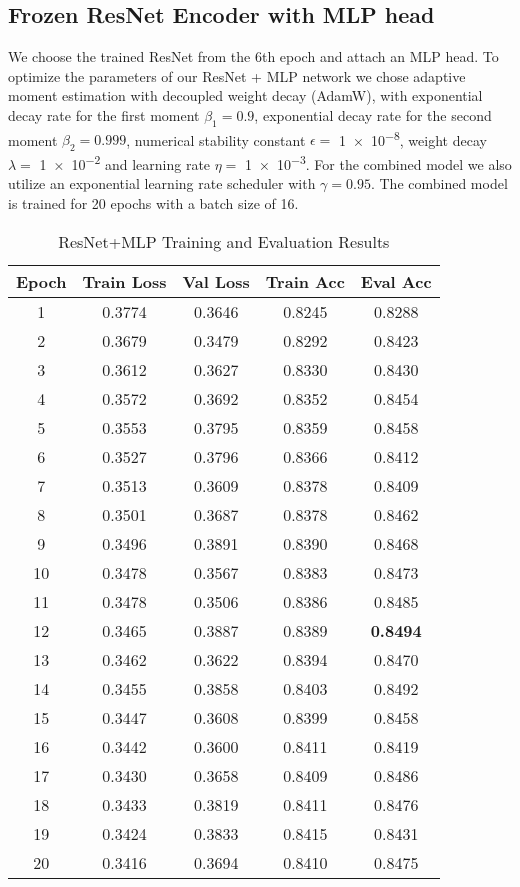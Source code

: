 \documentclass{article}
\begin{document}

\subsection{Frozen ResNet Encoder with MLP head}
We choose the trained ResNet from the 6th epoch and attach an MLP head. 
To optimize the parameters of our ResNet + MLP network we chose adaptive moment estimation with decoupled weight decay (AdamW),
with exponential decay rate for the first moment $\beta_1=0.9$, exponential decay rate for the second moment $\beta_2= 0.999$,
numerical stability constant $\epsilon =$ \num{1e-8}, weight decay $\lambda=$ \num{1e-2} and learning rate $\eta=$ \num{1e-3}.
For the combined model we also utilize an exponential learning rate scheduler with $\gamma=0.95$. 
The combined model is trained for 20 epochs with a batch size of 16.
\begin{table}[h!]
    \centering
    \caption{ResNet+MLP Training and Evaluation Results}
    \begin{tabular}{c|c|c|c|c}
    \hline
    \textbf{Epoch} & \textbf{Train Loss} & \textbf{Val Loss} & \textbf{Train Acc} & \textbf{Eval Acc} \\
    \hline
    1  & 0.3774 & 0.3646 & 0.8245 & 0.8288 \\
    2  & 0.3679 & 0.3479 & 0.8292 & 0.8423 \\
    3  & 0.3612 & 0.3627 & 0.8330 & 0.8430 \\
    4  & 0.3572 & 0.3692 & 0.8352 & 0.8454 \\
    5  & 0.3553 & 0.3795 & 0.8359 & 0.8458 \\
    6  & 0.3527 & 0.3796 & 0.8366 & 0.8412 \\
    7  & 0.3513 & 0.3609 & 0.8378 & 0.8409 \\
    8  & 0.3501 & 0.3687 & 0.8378 & 0.8462 \\
    9  & 0.3496 & 0.3891 & 0.8390 & 0.8468 \\
    10 & 0.3478 & 0.3567 & 0.8383 & 0.8473 \\
    11 & 0.3478 & 0.3506 & 0.8386 & 0.8485 \\
    12 & 0.3465 & 0.3887 & 0.8389 & \bf{0.8494} \\
    13 & 0.3462 & 0.3622 & 0.8394 & 0.8470 \\
    14 & 0.3455 & 0.3858 & 0.8403 & 0.8492 \\
    15 & 0.3447 & 0.3608 & 0.8399 & 0.8458 \\
    16 & 0.3442 & 0.3600 & 0.8411 & 0.8419 \\
    17 & 0.3430 & 0.3658 & 0.8409 & 0.8486 \\
    18 & 0.3433 & 0.3819 & 0.8411 & 0.8476 \\
    19 & 0.3424 & 0.3833 & 0.8415 & 0.8431 \\
    20 & 0.3416 & 0.3694 & 0.8410 & 0.8475 \\
    \hline
    \end{tabular}
    \end{table}
    
\end{document}
